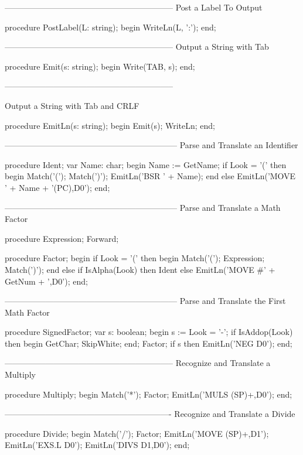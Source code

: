\documentclass[float=false, crop=false]{standalone}
\begin{document}
\begin{code}
{--------------------------------------------------------------}
{ Post a Label To Output }

procedure PostLabel(L: string);
begin
   WriteLn(L, ':');
end;


{--------------------------------------------------------------}
{ Output a String with Tab }

procedure Emit(s: string);
begin
   Write(TAB, s);
end;


{--------------------------------------------------------------}

{ Output a String with Tab and CRLF }

procedure EmitLn(s: string);
begin
   Emit(s);
   WriteLn;
end;


{---------------------------------------------------------------}
{ Parse and Translate an Identifier }

procedure Ident;
var Name: char;
begin
   Name := GetName;
   if Look = '(' then begin
      Match('(');
      Match(')');
      EmitLn('BSR ' + Name);
      end
   else
      EmitLn('MOVE ' + Name + '(PC),D0');
end;


{---------------------------------------------------------------}
{ Parse and Translate a Math Factor }

procedure Expression; Forward;

procedure Factor;
begin
   if Look = '(' then begin
      Match('(');
      Expression;
      Match(')');
      end
   else if IsAlpha(Look) then
      Ident
   else
      EmitLn('MOVE #' + GetNum + ',D0');
end;


{---------------------------------------------------------------}
{ Parse and Translate the First Math Factor }


procedure SignedFactor;
var s: boolean;
begin
   s := Look = '-';
   if IsAddop(Look) then begin
      GetChar;
      SkipWhite;
   end;
   Factor;
   if s then
      EmitLn('NEG D0');
end;


{--------------------------------------------------------------}
{ Recognize and Translate a Multiply }

procedure Multiply;
begin
   Match('*');
   Factor;
   EmitLn('MULS (SP)+,D0');
end;


{-------------------------------------------------------------}
{ Recognize and Translate a Divide }

procedure Divide;
begin
   Match('/');
   Factor;
   EmitLn('MOVE (SP)+,D1');
   EmitLn('EXS.L D0');
   EmitLn('DIVS D1,D0');
end;



\end{code}
\end{document}

